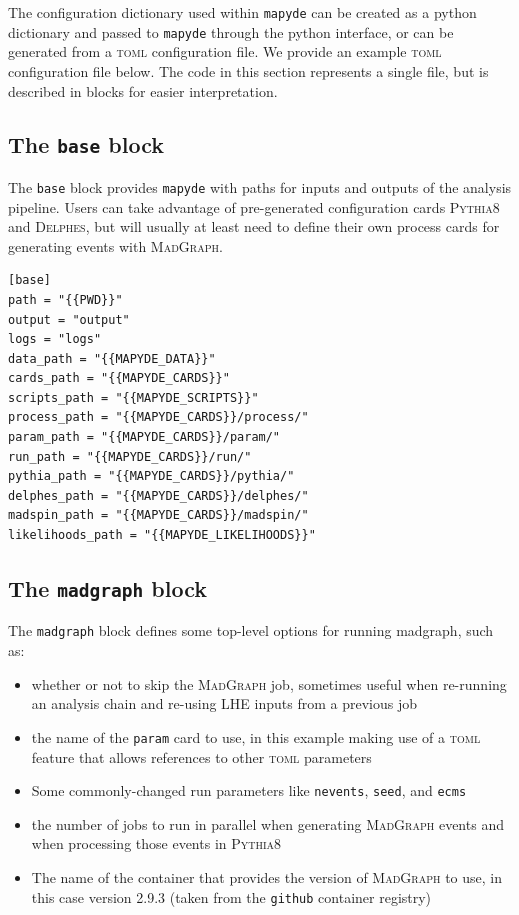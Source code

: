 \documentclass{article}
\newcommand{\mapyde}{\texttt{mapyde}}
\newcommand{\madgraph}{\textsc{MadGraph}}
\newcommand{\pythia}{\textsc{Pythia8}}
\newcommand{\delphes}{\textsc{Delphes}}
\newcommand{\toml}{\textsc{toml}}
\begin{document}
The configuration dictionary used within \mapyde{} can be created as a python dictionary and passed to \mapyde{} through the python interface, or can be generated from a \toml{} configuration file.  We provide an example \toml{} configuration file below.  The code in this section represents a single file, but is described in blocks for easier interpretation.

\subsection{The \texttt{base} block}
\label{ssec:the-base-block}

The \texttt{base} block provides \mapyde{} with paths for inputs and outputs of the analysis pipeline.  Users can take advantage of pre-generated configuration cards \pythia{} and \delphes, but will usually at least need to define their own process cards for generating events with \madgraph.

\begin{listing}[H]
	\begin{verbatim}
[base]
path = "{{PWD}}"
output = "output"
logs = "logs"
data_path = "{{MAPYDE_DATA}}"
cards_path = "{{MAPYDE_CARDS}}"
scripts_path = "{{MAPYDE_SCRIPTS}}"
process_path = "{{MAPYDE_CARDS}}/process/"
param_path = "{{MAPYDE_CARDS}}/param/"
run_path = "{{MAPYDE_CARDS}}/run/"
pythia_path = "{{MAPYDE_CARDS}}/pythia/"
delphes_path = "{{MAPYDE_CARDS}}/delphes/"
madspin_path = "{{MAPYDE_CARDS}}/madspin/"
likelihoods_path = "{{MAPYDE_LIKELIHOODS}}"
        \end{verbatim}
	\caption{The \texttt{base} block of an example \toml{} configuration file for generating slepton events.}
	\label{slepton-config-base}
\end{listing}

\subsection{The \texttt{madgraph} block}
\label{ssec:the-madgraph-block}

The \texttt{madgraph} block defines some top-level options for running madgraph, such as:

\begin{itemize}
	\item whether or not to skip the \madgraph{} job, sometimes useful when re-running an analysis chain and re-using LHE inputs from a previous job
	\item the name of the \texttt{param} card to use, in this example making use of a \toml{} feature that allows references to other \toml{} parameters
	\item Some commonly-changed run parameters like \texttt{nevents}, \texttt{seed}, and \texttt{ecms}
	\item the number of jobs to run in parallel when generating \madgraph{} events and when processing those events in \pythia
	\item The name of the container that provides the version of \madgraph{} to use, in this case version 2.9.3 (taken from the \texttt{github} container registry)
\end{itemize}
\end{document}
